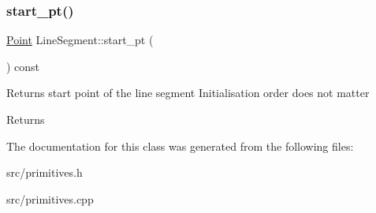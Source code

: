\subsubsection{\texorpdfstring{start\+\_\+pt()}{start\_pt()}}
{\footnotesize\ttfamily \hyperlink{classPoint}{Point} Line\+Segment\+::start\+\_\+pt (\begin{DoxyParamCaption}{ }\end{DoxyParamCaption}) const}

Returns start point of the line segment Initialisation order does not matter \begin{DoxyReturn}{Returns}

\end{DoxyReturn}


The documentation for this class was generated from the following files\+:\begin{DoxyCompactItemize}
\item 
src/primitives.\+h\item 
src/primitives.\+cpp\end{DoxyCompactItemize}
